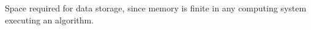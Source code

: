 
Space required for data storage, since memory is finite in any computing system
executing an algorithm.
